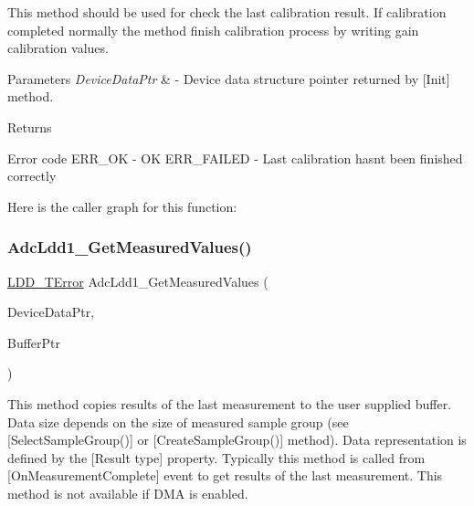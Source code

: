 This method should be used for check the last calibration result. If calibration completed normally the method finish calibration process by writing gain calibration values. 


\begin{DoxyParams}{Parameters}
{\em Device\+Data\+Ptr} & -\/ Device data structure pointer returned by \mbox{[}Init\mbox{]} method. \\
\hline
\end{DoxyParams}
\begin{DoxyReturn}{Returns}

\begin{DoxyItemize}
\item Error code E\+R\+R\+\_\+\+OK -\/ OK E\+R\+R\+\_\+\+F\+A\+I\+L\+ED -\/ Last calibration hasn\textquotesingle{}t been finished correctly 
\end{DoxyItemize}
\end{DoxyReturn}
Here is the caller graph for this function\+:
\mbox{\label{group___adc_ldd1__module_ga30f524b93639b958a529d6f91c41ce6d}} 
\subsubsection{\texorpdfstring{Adc\+Ldd1\+\_\+\+Get\+Measured\+Values()}{AdcLdd1\_GetMeasuredValues()}}
{\footnotesize\ttfamily \hyperlink{group___p_e___types__module_ga24c2b045fd04e79e85f261ce4df35588}{L\+D\+D\+\_\+\+T\+Error} Adc\+Ldd1\+\_\+\+Get\+Measured\+Values (\begin{DoxyParamCaption}\item[{\hyperlink{group___p_e___types__module_gac5cf1362f1f0e3a2ce71b1bf2276d091}{L\+D\+D\+\_\+\+T\+Device\+Data} $\ast$}]{Device\+Data\+Ptr,  }\item[{\hyperlink{group___p_e___types__module_gade8ef9401405bd941b6da738b807f980}{L\+D\+D\+\_\+\+T\+Data} $\ast$}]{Buffer\+Ptr }\end{DoxyParamCaption})}



This method copies results of the last measurement to the user supplied buffer. Data size depends on the size of measured sample group (see \mbox{[}Select\+Sample\+Group()\mbox{]} or \mbox{[}Create\+Sample\+Group()\mbox{]} method). Data representation is defined by the \mbox{[}Result type\mbox{]} property. Typically this method is called from \mbox{[}On\+Measurement\+Complete\mbox{]} event to get results of the last measurement. This method is not available if D\+MA is enabled. 


